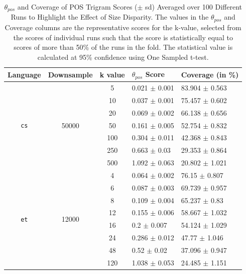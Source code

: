 \begin{table}[H]
    \centering
    \begin{tabular}{|c|c||c|l|l|}
        \hline
        \textbf{Language} & \textbf{Downsample} & \textbf{k value} & \textbf{$\theta_{pos}$ Score} & \textbf{Coverage (in \%)}\\
        \hline
        \hline
        \multirow{7}{*}{\texttt{cs}} & \multirow{7}{*}{50000} & 5 & 0.021 $\pm$ 0.001 & 83.904 $\pm$ 0.563\\
        & & 10 & 0.037 $\pm$ 0.001 & 75.457 $\pm$ 0.602\\
        & & 20 & 0.069 $\pm$ 0.002 & 66.138 $\pm$ 0.656\\
        & & 50 & 0.161 $\pm$ 0.005 & 52.754 $\pm$ 0.832\\
        & & 100 & 0.304 $\pm$ 0.011 & 42.368 $\pm$ 0.843\\
        & & 250 & 0.663 $\pm$ 0.03 & 29.353 $\pm$ 0.864\\
        & & 500 & 1.092 $\pm$ 0.063 & 20.802 $\pm$ 1.021\\
        \hline
        \hline
        \multirow{8}{*}{\texttt{et}} & \multirow{8}{*}{12000} & 4 & 0.064 $\pm$ 0.002 & 76.15 $\pm$ 0.807\\
        & & 6 & 0.087 $\pm$ 0.003 & 69.739 $\pm$ 0.957\\
        & & 8 & 0.109 $\pm$ 0.004 & 65.237 $\pm$ 0.83\\
        & & 12 & 0.155 $\pm$ 0.006 & 58.667 $\pm$ 1.032\\
        & & 16 & 0.2 $\pm$ 0.007 & 54.124 $\pm$ 1.029\\
        & & 24 & 0.286 $\pm$ 0.012 & 47.77 $\pm$ 1.046\\
        & & 48 & 0.52 $\pm$ 0.02 & 37.096 $\pm$ 0.947\\
        & & 120 & 1.038 $\pm$ 0.053 & 24.485 $\pm$ 1.151\\
        \hline
    \end{tabular}
    \caption[$\theta_{pos}$ and Coverage of POS Trigram Scores ($\pm$ sd) Averaged over 100 Different Runs to Highlight the Effect of Size Disparity]{$\theta_{pos}$ and Coverage of POS Trigram Scores ($\pm$ sd) Averaged over 100 Different Runs to Highlight the Effect of Size Disparity. The values in the $\theta_{pos}$ and Coverage columns are the representative scores for the k-value, selected from the scores of individual runs such that the score is statistically equal to scores of more than 50\% of the runs in the fold. The statistical value is calculated at 95\% confidence using One Sampled t-test.}
    \label{tab:pos-harmony-size}
\end{table}

